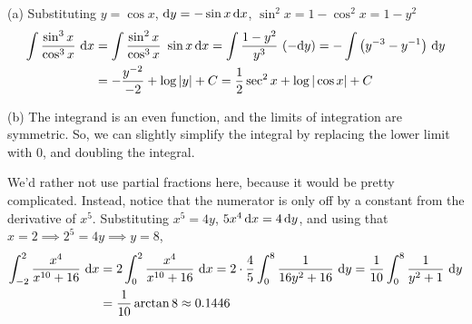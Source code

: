 \begin{solution} (a)
Substituting $y=\cos x$, $\mathrm{d}y=-\sin x\,\mathrm{d}x$, $\sin^2 x = 1-\cos^2x=1-y^2$
\begin{align*}
\int \frac{\sin^3x}{\cos^3x}\ \mathrm{d}x
&=\int \frac{\sin^2 x}{\cos^3 x}\ \sin x\,\mathrm{d}x
=\int \frac{1-y^2}{y^3}\ (-\mathrm{d}y)
=-\int \big( y^{-3}-y^{-1}\big)\ \mathrm{d}y\\
&=-\frac{y^{-2}}{-2}+\log|y|+C
=\frac{1}{2}\sec^2 x+\log|\cos x|+C
\end{align*}

\noindent (b)
The integrand is an even function, and the limits of integration are symmetric. So, we can slightly simplify the integral by replacing the lower limit with 0, and doubling the integral.

We'd rather not use partial fractions here, because it would be pretty complicated. Instead, notice that the numerator is only off by a constant from the derivative of $x^5$.
Substituting $x^5=4y$, $5x^4\,\mathrm{d}x=4\,\mathrm{d}y$,
and using that $x=2\implies 2^5=4y\implies y=8$,
\begin{align*}
\int_{-2}^{2}\frac{x^4}{x^{10}+16}\ \mathrm{d}x
&=2\int_0^{2}\frac{x^4}{x^{10}+16}\ \mathrm{d}x
=2\cdot\frac{4}{5}\int_0^{8}\frac{1}{16y^2+16}\ \mathrm{d}y
=\frac{1}{10}\int_0^{8}\frac{1}{y^2+1}\ \mathrm{d}y \\
&= \frac{1}{10}\arctan 8\approx 0.1446
\end{align*}

\end{solution}





